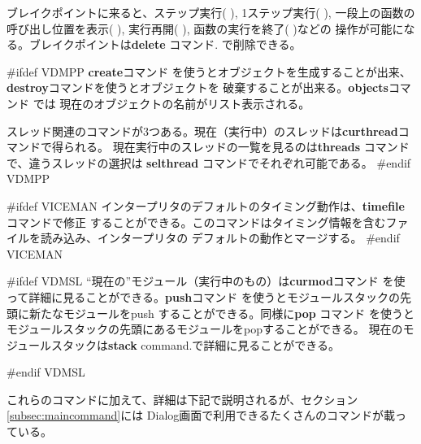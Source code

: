 \documentclass[\pformat,12pt]{article}
\newcommand{\guicmd}[1]{{\sf #1}}
\newcommand{\guicmd}[1]{{\gt #1}}
\begin{document}
ブレイクポイントに来ると、\guicmd{ステップ実行}(\hspace{-1.8mm}
),
\guicmd{1ステップ実行}(\hspace{-1.8mm} 
),
\guicmd{一段上の函数の呼び出し位置を表示}(\hspace{-1.8mm}
),
\guicmd{実行再開}(\hspace{-1.8mm}
),
\guicmd{函数の実行を終了}(\hspace{-1.8mm} 
)などの
操作が可能になる。ブレイクポイントは\textbf{delete} コマンド.
で削除できる。

#ifdef VDMPP
\textbf{create}コマンド を使うとオブジェクトを生成することが出来、
\textbf{destroy}コマンドを使うとオブジェクトを
破棄することが出来る。\textbf{objects}コマンド では
現在のオブジェクトの名前がリスト表示される。

スレッド関連のコマンドが3つある。現在（実行中）のスレッドは\textbf{curthread}コマンドで得られる。
現在実行中のスレッドの一覧を見るのは\textbf{threads} コマンドで、違うスレッドの選択は
\textbf{selthread} コマンドでそれぞれ可能である。
#endif VDMPP

#ifdef VICEMAN
インタープリタのデフォルトのタイミング動作は、\textbf{timefile} コマンドで修正
することができる。このコマンドはタイミング情報を含むファイルを読み込み、インタープリタの
デフォルトの動作とマージする。
#endif VICEMAN

#ifdef VDMSL
  ``現在の''モジュール（実行中のもの）は\textbf{curmod}コマンド 
  を使って詳細に見ることができる。\textbf{push}コマンド 
  を使うとモジュールスタックの先頭に新たなモジュールをpush
  することができる。同様に\textbf{pop} コマンド 
  を使うとモジュールスタックの先頭にあるモジュールをpopすることができる。
  現在のモジュールスタックは\textbf{stack} command.で詳細に見ることができる。
  
#endif VDMSL

これらのコマンドに加えて、詳細は下記で説明されるが、セクション\ref{subsec:maincommand}には
\guicmd{Dialog}画面で利用できるたくさんのコマンドが載っている。
\end{document}
